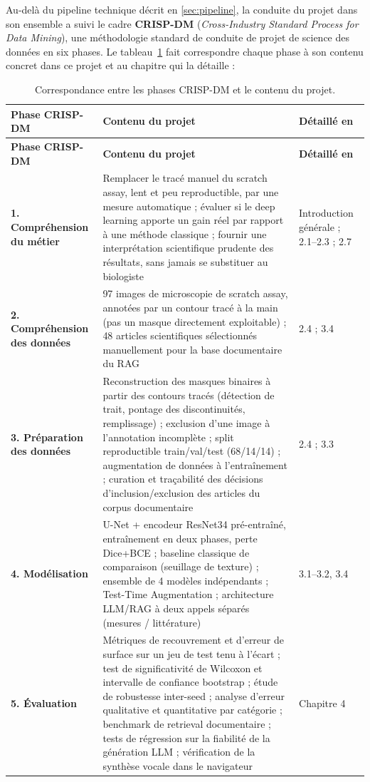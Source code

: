 \documentclass[12pt,a4paper]{report}
\begin{document}
Au-delà du pipeline technique décrit en \ref{sec:pipeline}, la conduite du projet dans son ensemble a suivi le cadre \textbf{CRISP-DM} (\textit{Cross-Industry Standard Process for Data Mining}), une méthodologie standard de conduite de projet de science des données en six phases. Le tableau~\ref{tab:crispdm} fait correspondre chaque phase à son contenu concret dans ce projet et au chapitre qui la détaille :

\begin{longtable}{p{3.2cm} p{8.5cm} p{2.3cm}}
\caption{Correspondance entre les phases CRISP-DM et le contenu du projet.}
\label{tab:crispdm} \\
\toprule
\textbf{Phase CRISP-DM} & \textbf{Contenu du projet} & \textbf{Détaillé en} \\
\midrule
\endfirsthead
\toprule
\textbf{Phase CRISP-DM} & \textbf{Contenu du projet} & \textbf{Détaillé en} \\
\midrule
\endhead
\textbf{1. Compréhension du métier} & Remplacer le tracé manuel du scratch assay, lent et peu reproductible, par une mesure automatique ; évaluer si le deep learning apporte un gain réel par rapport à une méthode classique ; fournir une interprétation scientifique prudente des résultats, sans jamais se substituer au biologiste & Introduction générale ; 2.1--2.3 ; 2.7 \\
\textbf{2. Compréhension des données} & 97 images de microscopie de scratch assay, annotées par un contour tracé à la main (pas un masque directement exploitable) ; 48 articles scientifiques sélectionnés manuellement pour la base documentaire du RAG & 2.4 ; 3.4 \\
\textbf{3. Préparation des données} & Reconstruction des masques binaires à partir des contours tracés (détection de trait, pontage des discontinuités, remplissage) ; exclusion d'une image à l'annotation incomplète ; split reproductible train/val/test (68/14/14) ; augmentation de données à l'entraînement ; curation et traçabilité des décisions d'inclusion/exclusion des articles du corpus documentaire & 2.4 ; 3.3 \\
\textbf{4. Modélisation} & U-Net + encodeur ResNet34 pré-entraîné, entraînement en deux phases, perte Dice+BCE ; baseline classique de comparaison (seuillage de texture) ; ensemble de 4 modèles indépendants ; Test-Time Augmentation ; architecture LLM/RAG à deux appels séparés (mesures / littérature) & 3.1--3.2, 3.4 \\
\textbf{5. Évaluation} & Métriques de recouvrement et d'erreur de surface sur un jeu de test tenu à l'écart ; test de significativité de Wilcoxon et intervalle de confiance bootstrap ; étude de robustesse inter-seed ; analyse d'erreur qualitative et quantitative par catégorie ; benchmark de retrieval documentaire ; tests de régression sur la fiabilité de la génération LLM ; vérification de la synthèse vocale dans le navigateur & Chapitre 4 \\

\end{longtable}
\end{document}
